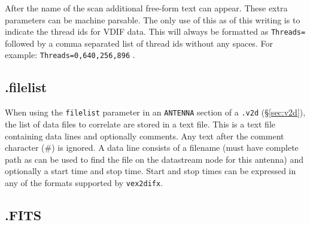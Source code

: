 After the name of the scan additional free-form text can appear.
These extra parameters can be machine parsable.
The only use of this as of this writing is to indicate the thread ids for VDIF data.
This will always be formatted as {\tt Threads=} followed by a comma separated list of thread ids without any spaces.  For example: {\tt Threads=0,640,256,896} .








\subsection{.filelist} \label{sec:filelist}

When using the {\tt filelist} parameter in an {\tt ANTENNA} section of a {\tt .v2d} (\S\ref{sec:v2d}), the list of data files to correlate are stored in a text file.
This is a text file containing data lines and optionally comments.
Any text after the comment character (\#) is ignored.
A data line consists of a filename (must have complete path as can be used to find the file on the datastream node for this antenna) and optionally a start time and stop time.
Start and stop times can be expressed in any of the formats supported by {\tt vex2difx}.






\subsection{.FITS} \label{sec:FITS}

